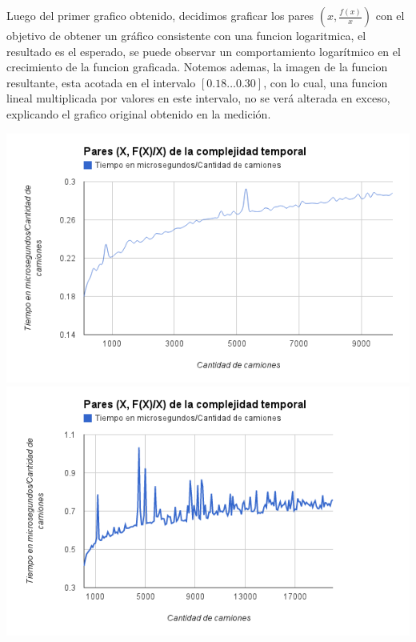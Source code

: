 Luego del primer grafico obtenido, decidimos graficar los pares $(x, \frac{f(x)}{x})$ con el objetivo de obtener un gr\'afico consistente con una funcion logaritmica, el resultado es el esperado, se puede observar un comportamiento logar\'itmico en el crecimiento de la funcion graficada. Notemos ademas, la imagen de la funcion resultante, esta acotada en el intervalo $\left[ 0.18 \dots 0.30\right]$, con lo cual, una funcion lineal multiplicada por valores en este intervalo, no se ver\'a alterada en exceso, explicando el grafico original obtenido en la medici\'on.
\begin{center}
	\includegraphics[scale=0.6]{images/ej1_fx_x.png}
	\includegraphics[scale=0.6]{images/ej1_fx_x_bis.png}
\end{center}

